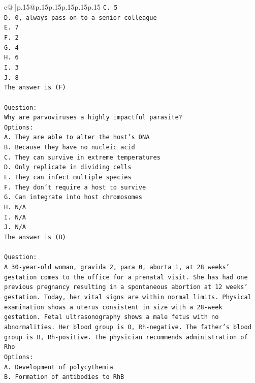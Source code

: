 \documentclass{article}
\begin{document}
{\begin{supertabular}{c@{$\;$}|p{.15\linewidth}@{}p{.15\linewidth}p{.15\linewidth}p{.15\linewidth}p{.15\linewidth}p{.15\linewidth}}
{{{\texttt{C. 5} \\
\texttt{D. 0, always pass on to a senior colleague} \\
\texttt{E. 7} \\
\texttt{F. 2} \\
\texttt{G. 4} \\
\texttt{H. 6} \\
\texttt{I. 3} \\
\texttt{J. 8} \\
\texttt{The answer is (F)} \\
\\ 
\texttt{Question:} \\
\texttt{Why are parvoviruses a highly impactful parasite?} \\
\texttt{Options:} \\
\texttt{A. They are able to alter the host's DNA} \\
\texttt{B. Because they have no nucleic acid} \\
\texttt{C. They can survive in extreme temperatures} \\
\texttt{D. Only replicate in dividing cells} \\
\texttt{E. They can infect multiple species} \\
\texttt{F. They don't require a host to survive} \\
\texttt{G. Can integrate into host chromosomes} \\
\texttt{H. N/A} \\
\texttt{I. N/A} \\
\texttt{J. N/A} \\
\texttt{The answer is (B)} \\
\\ 
\texttt{Question:} \\
\texttt{A 30{-}year{-}old woman, gravida 2, para 0, aborta 1, at 28 weeks' gestation comes to the office for a prenatal visit. She has had one previous pregnancy resulting in a spontaneous abortion at 12 weeks' gestation. Today, her vital signs are within normal limits. Physical examination shows a uterus consistent in size with a 28{-}week gestation. Fetal ultrasonography shows a male fetus with no abnormalities. Her blood group is O, Rh{-}negative. The father's blood group is B, Rh{-}positive. The physician recommends administration of Rho} \\
\texttt{Options:} \\
\texttt{A. Development of polycythemia} \\
\texttt{B. Formation of antibodies to RhB} \\
}}}
\end{supertabular}}
\end{document}
